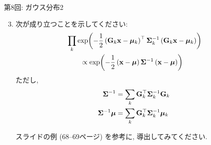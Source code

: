 \documentclass[dvipdfmx,notheorems,t]{beamer}
\begin{document}
\begin{frame}{第8回: ガウス分布2}
\begin{enumerate}
  \setcounter{enumi}{2}
  \item 次が成り立つことを示してください:
  \begin{align*}
    & \prod_k \exp(-\frac{1}{2} \left( \vb{G}_k \vb{x} - \vb*{\mu}_k \right)^\top
      \vb{\Sigma}_k^{-1} \left( \vb{G}_k \vb{x} - \vb*{\mu}_k \right)) \\
    & \qquad \propto \exp(-\frac{1}{2} \left( \vb{x} - \vb*{\mu} \right) \vb{\Sigma}^{-1}
      \left( \vb{x} - \vb*{\mu} \right))
  \end{align*}
  ただし,
  \begin{align*}
    \vb{\Sigma}^{-1} &= \sum_k \vb{G}_k^\top \vb{\Sigma}_k^{-1} \vb{G}_k \\
    \vb{\Sigma}^{-1} \vb*{\mu} &= \sum_k \vb{G}_k^\top \vb{\Sigma}_k^{-1} \vb*{\mu}_k
  \end{align*}

  スライドの例 (68--69ページ) を参考に, 導出してみてください.
\end{enumerate}
\end{frame}
\end{document}
